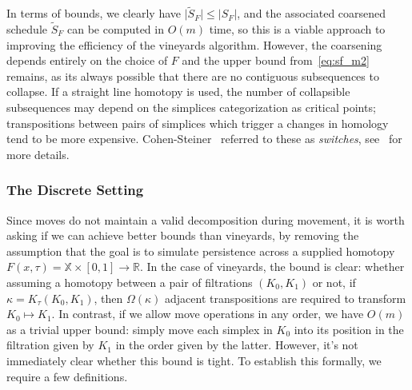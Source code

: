 \documentclass{siamart190516}
\begin{document}
In terms of bounds, we clearly have $\lvert \widetilde{S}_F \rvert \leq \lvert S_F \rvert$, and the associated coarsened schedule $\widetilde{S}_F$ can be computed in $O(m)$ time, so this is a viable approach to improving the efficiency of the vineyards algorithm. However, the coarsening depends entirely on the choice of $F$ and the upper bound from~\ref{eq:sf_m2} remains, as its always possible that there are no contiguous subsequences to collapse. If a straight line homotopy is used, the number of collapsible subsequences may depend on the simplices categorization as critical points; transpositions between pairs of simplices which trigger a changes in homology tend to be more expensive. Cohen-Steiner~\cite{cohen2006vines} referred to these as \emph{switches}, see~\cite{edelsbrunner2000topological} for more details. 

\subsubsection{The Discrete Setting} 
Since moves do not maintain a valid decomposition during movement, it is worth asking if we can achieve better bounds than vineyards, by removing the assumption that the goal is to simulate persistence across a supplied homotopy $F(x, \tau) = \mathbb{X} \times [0,1] \to \mathbb{R}$. In the case of vineyards, the bound is clear: whether assuming a homotopy between a pair of filtrations $(K_0, K_1)$ or not, if $\kappa = K_\tau(K_0, K_1)$, then $\Omega(\kappa)$ adjacent transpositions are required to transform $K_0 \mapsto K_1$. 
In contrast, if we allow move operations in any order, we have $O(m)$ as a trivial upper bound: simply move each simplex in $K_0$ into its position in the filtration given by $K_1$ in the order given by the latter. However, it's not immediately clear whether this bound is tight. To establish this formally, we require a few definitions.
\end{document}
